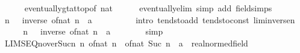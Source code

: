 \begin{isabellebody}
\ \ \ \ \isamarkupfalse%
\ eventually{\isacharunderscore}{\kern0pt}gt{\isacharunderscore}{\kern0pt}at{\isacharunderscore}{\kern0pt}top{\isacharbrackleft}{\kern0pt}of\ {\isachardoublequoteopen}{}{\isacharcolon}{\kern0pt}{\isacharcolon}{\kern0pt}nat{\isachardoublequoteclose}{\isacharbrackright}{\kern0pt}\isanewline
\ \ \ \ \isamarkupfalse%
\ eventually{\isacharunderscore}{\kern0pt}elim\ {\isacharparenleft}{\kern0pt}simp\ add{\isacharcolon}{\kern0pt}\ field{\isacharunderscore}{\kern0pt}simps{\isacharparenright}{\kern0pt}\isanewline
\ \ \isamarkupfalse%
\ {\isachardoublequoteopen}{\isacharparenleft}{\kern0pt}{\isasymlambda}n{\isachardot}{\kern0pt}\ {}\ {\isacharplus}{\kern0pt}\ inverse\ {\isacharparenleft}{\kern0pt}of{\isacharunderscore}{\kern0pt}nat\ n{\isacharparenright}{\kern0pt}\ {\isacharcolon}{\kern0pt}{\isacharcolon}{\kern0pt}\ {\isacharprime}{\kern0pt}a{\isacharparenright}{\kern0pt}\ {\isasymlonglonglongrightarrow}\ {}\ {\isacharplus}{\kern0pt}\ {}{\isachardoublequoteclose}\isanewline
\ \ \ \ \isamarkupfalse%
\ {\isacharparenleft}{\kern0pt}intro\ tendsto{\isacharunderscore}{\kern0pt}add\ tendsto{\isacharunderscore}{\kern0pt}const\ lim{\isacharunderscore}{\kern0pt}inverse{\isacharunderscore}{\kern0pt}n{\isacharparenright}{\kern0pt}\isanewline
\ \ \isamarkupfalse%
\ \isamarkupfalse%
\ {\isachardoublequoteopen}{\isacharparenleft}{\kern0pt}{\isasymlambda}n{\isachardot}{\kern0pt}\ {}\ {\isacharplus}{\kern0pt}\ inverse\ {\isacharparenleft}{\kern0pt}of{\isacharunderscore}{\kern0pt}nat\ n{\isacharparenright}{\kern0pt}\ {\isacharcolon}{\kern0pt}{\isacharcolon}{\kern0pt}\ {\isacharprime}{\kern0pt}a{\isacharparenright}{\kern0pt}\ {\isasymlonglonglongrightarrow}\ {}{\isachardoublequoteclose}\isanewline
\ \ \ \ \isamarkupfalse%
\ simp\isanewline
{}\isamarkupfalse%
%
\endisatagproof
{\isafoldproof}%
%
\isadelimproof
\isanewline
%
\endisadelimproof
\isanewline
{}\isamarkupfalse%
\ LIMSEQ{\isacharunderscore}{\kern0pt}n{\isacharunderscore}{\kern0pt}over{\isacharunderscore}{\kern0pt}Suc{\isacharunderscore}{\kern0pt}n{\isacharcolon}{\kern0pt}\ {\isachardoublequoteopen}{\isacharparenleft}{\kern0pt}{\isasymlambda}n{\isachardot}{\kern0pt}\ of{\isacharunderscore}{\kern0pt}nat\ n\ {\isacharslash}{\kern0pt}\ of{\isacharunderscore}{\kern0pt}nat\ {\isacharparenleft}{\kern0pt}Suc\ n{\isacharparenright}{\kern0pt}\ {\isacharcolon}{\kern0pt}{\isacharcolon}{\kern0pt}\ {\isacharprime}{\kern0pt}a\ {\isacharcolon}{\kern0pt}{\isacharcolon}{\kern0pt}\ real{\isacharunderscore}{\kern0pt}normed{\isacharunderscore}{\kern0pt}field{\isacharparenright}{\kern0pt}\ {\isasymlonglonglongrightarrow}\ {}{\isachardoublequoteclose}\isanewline

\end{isabellebody}
